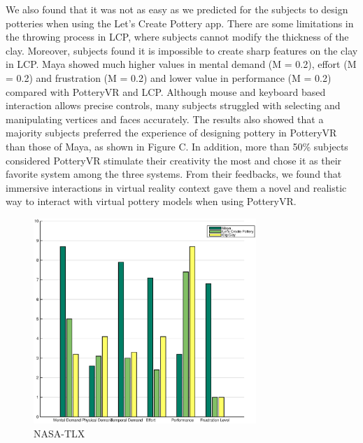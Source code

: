 We also found that it was not as easy as we predicted for the subjects to design potteries when using the Let's Create Pottery app. There are some limitations in the throwing process in LCP, where subjects cannot modify the thickness of the clay. Moreover, subjects found it is impossible to create sharp features on the clay in LCP. 
Maya showed much higher values in mental demand (M = 0.2), effort (M = 0.2) and frustration (M = 0.2) and lower value in performance (M = 0.2) compared with PotteryVR and LCP. Although mouse and keyboard based interaction allows precise controls, many subjects struggled with selecting and manipulating vertices and faces accurately.
The results also showed that a majority subjects preferred the experience of designing pottery in PotteryVR than those of Maya, as shown in Figure C. In addition, more than 50\% subjects considered PotteryVR stimulate their creativity the most and chose it as their favorite system among the three systems. From their feedbacks, we found that immersive interactions in virtual reality context gave them a novel and realistic way to interact with virtual pottery models when using PotteryVR.
\begin{figure}
  \includegraphics[width=0.75\textwidth]{fig7.eps}
\caption{NASA-TLX}
\label{fig:7}       %
\end{figure}

